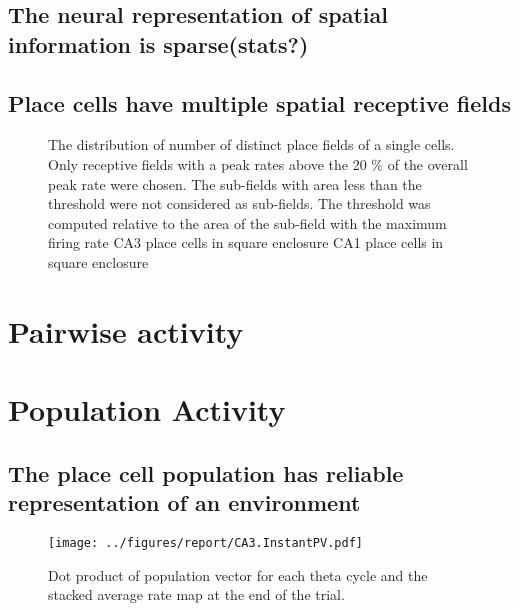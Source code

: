 \subsection[Sparse encoding]{The neural representation of spatial information is sparse(stats?)}
\subsection[Multiple Place fields]{Place cells have multiple spatial receptive fields}
\begin{figure}[htb!]
\label{fig:nsubfields}
\caption[Multiple receptive fields of Place Cells]{The distribution of number of distinct place fields of a single cells. Only receptive fields with a peak rates above the 20 \% of the overall peak rate were chosen. The sub-fields with area less than the threshold were not considered as sub-fields. The threshold was computed relative to the area of the sub-field with the maximum firing rate  CA3 place cells in square enclosure  CA1 place cells in square enclosure}
\end{figure}

\section{Pairwise activity}

\section{Population Activity}
\subsection[Population activity within a fixed environment]{The place cell population has reliable representation of an environment}

\begin{figure}[htb!]
\centering
\texttt{[image: ../figures/report/CA3.InstantPV.pdf]}
\label{fig:sf1}
\caption{Dot product of population vector for each theta cycle and the stacked average rate map at the end of the trial.}
\end{figure}

